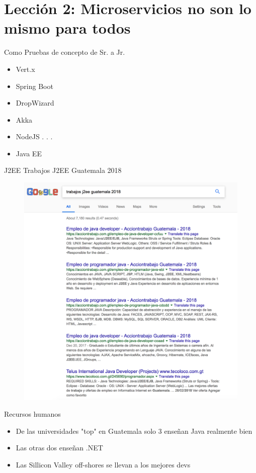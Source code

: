 \documentclass{beamer}
\begin{document}
\section{Lección 2: Microservicios no son lo mismo para todos}
\begin{frame}{Como}
Pruebas de concepto de Sr. a Jr.
\begin{itemize}
\item Vert.x
\item Spring Boot
\item DropWizard
\item Akka
\item NodeJS
. . .
\item Java EE
\end{itemize}
\end{frame}

\begin{frame}{J2EE}
Trabajos J2EE Guatemala 2018
\begin{figure}
\centering
\includegraphics[width=\linewidth]{Images/javaee}
\end{figure}
\end{frame}

\begin{frame}{Recursos humanos}
\begin{itemize}
\item De las universidades "top" en Guatemala solo 3 enseñan Java realmente bien
\item Las otras dos enseñan .NET
\item Las Sillicon Valley off-shores se llevan a los mejores devs
\end{itemize}
\end{frame}
\end{document}
